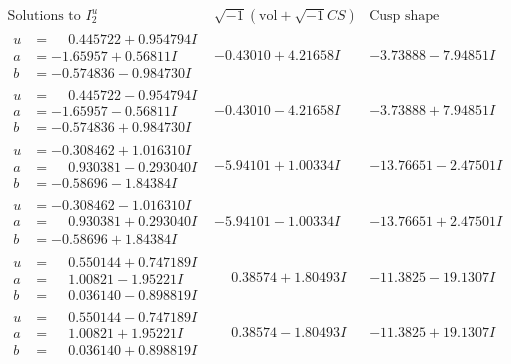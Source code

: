 \documentclass[1p]{elsarticle_modified}
\theoremstyle{definition}
\newcommand{\I}{\sqrt{-1}}
\begin{document}
$$\begin{array}{c|c|c}  
\text{Solutions to }I^u_{2}& \I (\text{vol} + \sqrt{-1}CS) & \text{Cusp shape}\\
 \hline 
\begin{aligned}
u &= \phantom{-}0.445722 + 0.954794 I \\
a &= -1.65957 + 0.56811 I \\
b &= -0.574836 - 0.984730 I\end{aligned}
 & -0.43010 + 4.21658 I & -3.73888 - 7.94851 I \\ \hline\begin{aligned}
u &= \phantom{-}0.445722 - 0.954794 I \\
a &= -1.65957 - 0.56811 I \\
b &= -0.574836 + 0.984730 I\end{aligned}
 & -0.43010 - 4.21658 I & -3.73888 + 7.94851 I \\ \hline\begin{aligned}
u &= -0.308462 + 1.016310 I \\
a &= \phantom{-}0.930381 - 0.293040 I \\
b &= -0.58696 - 1.84384 I\end{aligned}
 & -5.94101 + 1.00334 I & -13.76651 - 2.47501 I \\ \hline\begin{aligned}
u &= -0.308462 - 1.016310 I \\
a &= \phantom{-}0.930381 + 0.293040 I \\
b &= -0.58696 + 1.84384 I\end{aligned}
 & -5.94101 - 1.00334 I & -13.76651 + 2.47501 I \\ \hline\begin{aligned}
u &= \phantom{-}0.550144 + 0.747189 I \\
a &= \phantom{-}1.00821 - 1.95221 I \\
b &= \phantom{-}0.036140 - 0.898819 I\end{aligned}
 & \phantom{-}0.38574 + 1.80493 I & -11.3825 - 19.1307 I \\ \hline\begin{aligned}
u &= \phantom{-}0.550144 - 0.747189 I \\
a &= \phantom{-}1.00821 + 1.95221 I \\
b &= \phantom{-}0.036140 + 0.898819 I\end{aligned}
 & \phantom{-}0.38574 - 1.80493 I & -11.3825 + 19.1307 I \\ \hline\begin{aligned}

\end{aligned}
\end{array}$$
\end{document}
